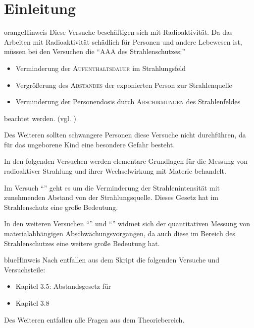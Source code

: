 \documentclass[../protokoll.tex]{subfiles}
\begin{document}
\part{Einleitung}
\begin{messageBox}{orange}{Hinweis}
Diese Versuche beschäftigen sich mit Radioaktivität. Da das Arbeiten mit
Radioaktivität schädlich für Personen und andere Lebewesen ist, müssen bei den
Versuchen die "`AAA des Strahlenschutzes:"'
\begin{itemize}
    \item Verminderung der \textsc{Aufenthaltsdauer} im Strahlungsfeld
    \item Vergrößerung des \textsc{Abstandes} der exponierten Person zur Strahlenquelle
    \item Verminderung der Personendosis durch \textsc{Abschirmungen} des Strahlenfeldes
\end{itemize}
beachtet werden. (vgl. \cite{AAA-Regel})

Des Weiteren sollten schwangere Personen diese Versuche nicht
durchführen, da für das ungeborene Kind eine besondere Gefahr besteht.
\end{messageBox}

In den folgenden Versuchen werden elementare Grundlagen für die Messung von
radioaktiver Strahlung und ihrer Wechselwirkung mit Materie behandelt.

Im Versuch "`"' geht es um die Verminderung der
Strahlenintensität mit zunehmenden Abstand von der Strahlungsquelle. Dieses
Gesetz hat im Strahlenschutz eine große Bedeutung.

In den weiteren Versuchen "`"' und
"`"' widmet sich der quantitativen
Messung von materialabhängigen Abschwächungsvorgängen, da auch diese im Bereich
des Strahlenschutzes eine weitere große Bedeutung hat.

\begin{messageBox}{blue}{Hinweis}
    Nach \cite{listeEntfallendeVersuche} entfallen aus dem Skript die folgenden
    Versuche und Versuchsteile:
    \begin{itemize}
        \item Kapitel 3.5: Abstandsgesetz für 
        \item Kapitel 3.8
    \end{itemize}

    Des Weiteren entfallen alle Fragen aus dem Theoriebereich.
\end{messageBox}
\end{document}
